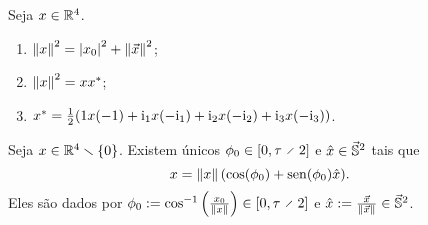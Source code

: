 \begin{exercise}
Seja $x \in \R^4$.
	\begin{enumerate}
	\item $\nor{x}^2 = \abs{\esc{x}}^2 + \nor{\vec{x}}^2$;
	\item $\nor{x}^2 = x\conju{x}$;
	\item $\conju{x} = \frac{1}{2}(1x(-1) + \ii_1 x (-\ii_1) + \ii_2 x (-\ii_2) + \ii_3 x (-\ii_3))$.
	\end{enumerate}
\end{exercise}

\begin{proposition}
Seja $x \in \R^4 \setminus \{0\}$. Existem únicos $\phi_0 \in \intff{0}{\tau \div 2}$ e $\hat{x} \in \vec{\S}^2$ tais que
	\begin{equation*}
	x = \nor{x}(\cos(\phi_0) + \sin(\phi_0) \hat{x}).
	\end{equation*}
Eles são dados por $\phi_0 := \cos\inv\left( \frac{\esc{x}}{\nor{x}} \right) \in \intff{0}{\tau \div 2}$ e $\hat{x} := \frac{\vec{x}}{\nor{\vec{x}}} \in \vec{\S}^2$.
\end{proposition}
